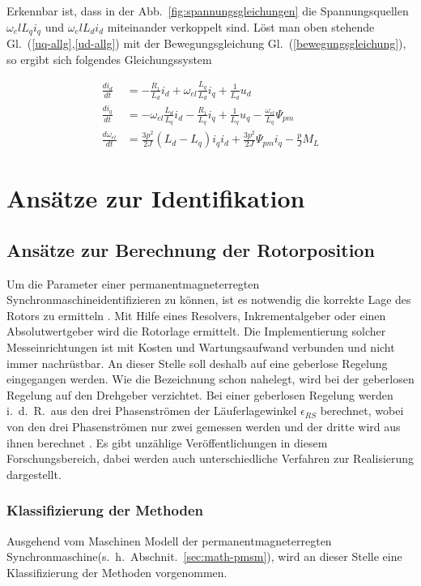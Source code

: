 \documentclass[conference,twocolumn]{IEEEtran}
\newcommand{\pmsm}{permanentmagneterregten Synchronmaschine}
\begin{document}
Erkennbar ist, dass in der Abb.~\ref{fig:spannungsgleichungen} die Spannungsquellen $\omega_el L_q i_q$ und $\omega_el L_d i_d$ miteinander verkoppelt sind.
Löst man oben stehende Gl.~(\ref{uq-allg},\ref{ud-allg}) mit der Bewegungsgleichung Gl.~(\ref{bewegungsgleichung}), so ergibt sich folgendes Gleichungssystem

\begin{align}
\frac{di_d}{dt} &= -\frac{R_1}{L_d}i_d+\omega_{el}\frac{L_q}{L_d}i_q+\frac{1}{L_d}u_d \\
\frac{di_q}{dt} &= -\omega_{el}\frac{L_d}{L_q}i_d - \frac{R_1}{L_q}i_q + \frac{1}{L_q}u_q-\frac{\omega_{el}}{L_q}\Psi_{pm} \\
\frac{d\omega_{el}}{dt} &= \frac{3p^2}{2J}(L_d - L_q)i_q i_d + \frac{3p^2}{2J} \Psi_{pm} i_q - \frac{p}{J} M_L
\end{align}

\section{Ansätze zur Identifikation}\label{sec:identifikation}
\subsection{Ansätze zur Berechnung der Rotorposition}\label{sec:rotorposition}

Um die Parameter einer \pmsm identifizieren zu können, ist es notwendig die korrekte Lage des Rotors zu ermitteln \autocites{underwood_online_2010}{rahman_identification_2005}{piippo_adaptation_2009}.
Mit Hilfe eines Resolvers, Inkrementalgeber oder einen Absolutwertgeber wird die Rotorlage ermittelt.
Die Implementierung solcher Messeinrichtungen ist mit Kosten und Wartungsaufwand verbunden und nicht immer nachrüstbar.
An dieser Stelle soll deshalb auf eine geberlose Regelung eingegangen werden.
Wie die Bezeichnung schon nahelegt, wird bei der geberlosen Regelung auf den Drehgeber verzichtet.
Bei einer geberlosen Regelung werden i.\ d.\ R.\ aus den drei Phasenströmen der Läuferlagewinkel $\epsilon_{RS}$ berechnet, wobei von den drei Phasenströmen nur zwei gemessen werden und der dritte wird aus ihnen berechnet \autocite{ternesfeldkamp}.
Es gibt unzählige Veröffentlichungen in diesem Forschungsbereich, dabei werden auch unterschiedliche Verfahren zur Realisierung dargestellt.

\subsubsection{Klassifizierung der Methoden}
Ausgehend vom Maschinen Modell der \pmsm (s.~h.~Abschnit.~\ref{sec:math-pmsm}), wird an dieser Stelle eine Klassifizierung der Methoden vorgenommen.
\end{document}
